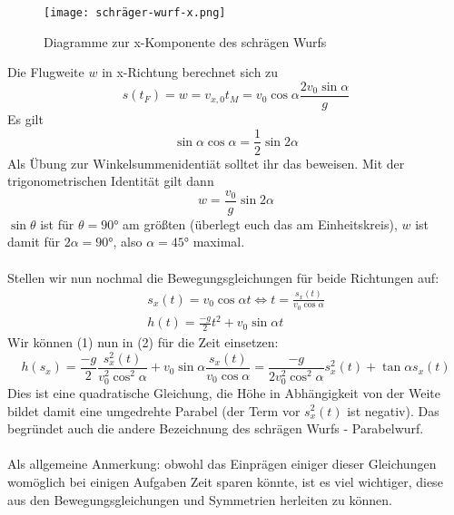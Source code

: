 \documentclass[11pt]{article}
\begin{document}
\begin{figure}[H] 
    \centering
       \texttt{[image: schräger-wurf-x.png]}
       \caption{Diagramme zur x-Komponente des schrägen Wurfs}
\end{figure} 
Die Flugweite $w$ in x-Richtung berechnet sich zu 
\begin{equation*}
    s(t_F) = w = v_{x, 0}t_M = v_0\cos\alpha\frac{2v_0\sin\alpha}{g}
\end{equation*}
Es gilt 
$$\sin\alpha\cos\alpha = \frac{1}{2} \sin2\alpha$$
Als Übung zur Winkelsummenidentiät solltet ihr das beweisen. Mit der trigonometrischen Identität gilt dann
$$w=\frac{v_0}{g}\sin2\alpha$$
$\sin\theta$ ist für $\theta = 90$° am größten (überlegt euch das am Einheitskreis), $w$ ist damit für $2\alpha=90$°, also $\alpha = 45$° maximal. \\\\
Stellen wir nun nochmal die Bewegungsgleichungen für beide Richtungen auf: 
\begin{gather}
    s_x(t) = v_0\cos\alpha t \Longleftrightarrow t = \frac{s_x(t)}{v_0\cos\alpha} \\
    h(t) = \frac{-g}{2}t^2 + v_0\sin\alpha t  
\end{gather}
Wir können (1) nun in (2) für die Zeit einsetzen: 
\begin{equation}
    h(s_x) = \frac{-g}{2}\frac{s_x^2(t)}{v_0^2\cos^2\alpha} + v_0\sin\alpha\frac{s_x(t)}{v_0\cos\alpha} = \frac{-g}{2v_0^2\cos^2\alpha}s_x^2(t) +\tan\alpha s_x(t)
\end{equation}
Dies ist eine quadratische Gleichung, die Höhe in Abhängigkeit von der Weite bildet damit eine umgedrehte Parabel (der Term vor $s_x^2(t)$ ist negativ). Das begründet auch die andere Bezeichnung des schrägen Wurfs - Parabelwurf. \\\\
Als allgemeine Anmerkung: obwohl das Einprägen einiger dieser Gleichungen womöglich bei einigen Aufgaben Zeit sparen könnte, ist es viel wichtiger, diese aus den Bewegungsgleichungen und Symmetrien herleiten zu können. 
\end{document}

